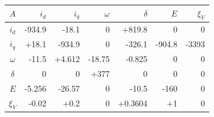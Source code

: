 \begin{tabular}{crrrrrr}\toprule
$A$ & $i_d$ & $i_q$ & $\omega$ & $\delta$ & $E$ & $\xi_{V}$\\\midrule
$i_d$ & -934.9 & -18.1 & 0 & +819.8 & 0 & 0\\
$i_q$ & +18.1 & -934.9 & 0 & -326.1 & -904.8 & -3393\\
$\omega$ & -11.5 & +4.612 & -18.75 & -0.825 & 0 & 0\\
$\delta$ & 0 & 0 & +377 & 0 & 0 & 0\\
$E$ & -5.256 & -26.57 & 0 & -10.5 & -160 & 0\\
$\xi_{V}$ & -0.02 & +0.2 & 0 & +0.3604 & +1 & 0\\
\bottomrule
\end{tabular}
